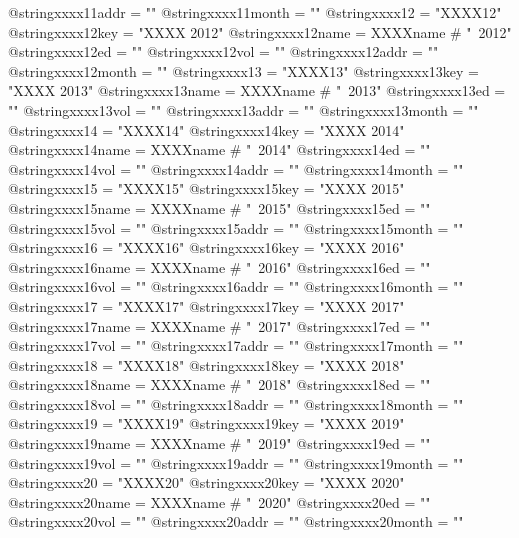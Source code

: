 @string{xxxx11addr =            ""}
@string{xxxx11month =           ""}
@string{xxxx12 =                "XXXX12"}
@string{xxxx12key =             "XXXX 2012"}
@string{xxxx12name =            XXXXname # "~2012"}
@string{xxxx12ed =              ""}
@string{xxxx12vol =             ""}
@string{xxxx12addr =            ""}
@string{xxxx12month =           ""}
@string{xxxx13 =                "XXXX13"}
@string{xxxx13key =             "XXXX 2013"}
@string{xxxx13name =            XXXXname # "~2013"}
@string{xxxx13ed =              ""}
@string{xxxx13vol =             ""}
@string{xxxx13addr =            ""}
@string{xxxx13month =           ""}
@string{xxxx14 =                "XXXX14"}
@string{xxxx14key =             "XXXX 2014"}
@string{xxxx14name =            XXXXname # "~2014"}
@string{xxxx14ed =              ""}
@string{xxxx14vol =             ""}
@string{xxxx14addr =            ""}
@string{xxxx14month =           ""}
@string{xxxx15 =                "XXXX15"}
@string{xxxx15key =             "XXXX 2015"}
@string{xxxx15name =            XXXXname # "~2015"}
@string{xxxx15ed =              ""}
@string{xxxx15vol =             ""}
@string{xxxx15addr =            ""}
@string{xxxx15month =           ""}
@string{xxxx16 =                "XXXX16"}
@string{xxxx16key =             "XXXX 2016"}
@string{xxxx16name =            XXXXname # "~2016"}
@string{xxxx16ed =              ""}
@string{xxxx16vol =             ""}
@string{xxxx16addr =            ""}
@string{xxxx16month =           ""}
@string{xxxx17 =                "XXXX17"}
@string{xxxx17key =             "XXXX 2017"}
@string{xxxx17name =            XXXXname # "~2017"}
@string{xxxx17ed =              ""}
@string{xxxx17vol =             ""}
@string{xxxx17addr =            ""}
@string{xxxx17month =           ""}
@string{xxxx18 =                "XXXX18"}
@string{xxxx18key =             "XXXX 2018"}
@string{xxxx18name =            XXXXname # "~2018"}
@string{xxxx18ed =              ""}
@string{xxxx18vol =             ""}
@string{xxxx18addr =            ""}
@string{xxxx18month =           ""}
@string{xxxx19 =                "XXXX19"}
@string{xxxx19key =             "XXXX 2019"}
@string{xxxx19name =            XXXXname # "~2019"}
@string{xxxx19ed =              ""}
@string{xxxx19vol =             ""}
@string{xxxx19addr =            ""}
@string{xxxx19month =           ""}
@string{xxxx20 =                "XXXX20"}
@string{xxxx20key =             "XXXX 2020"}
@string{xxxx20name =            XXXXname # "~2020"}
@string{xxxx20ed =              ""}
@string{xxxx20vol =             ""}
@string{xxxx20addr =            ""}
@string{xxxx20month =           ""}



